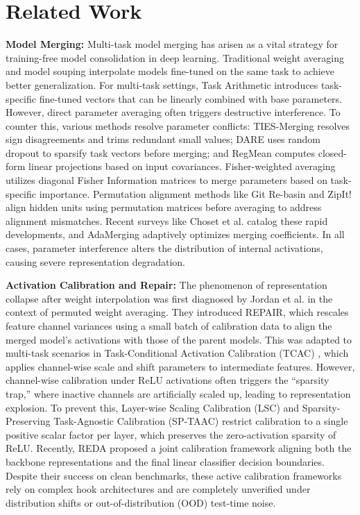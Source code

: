 \documentclass{article}
\begin{document}
\section{Related Work}
\label{sec:related}
\textbf{Model Merging:} Multi-task model merging has arisen as a vital strategy for training-free model consolidation in deep learning. Traditional weight averaging \cite{izmailov2018averaging} and model souping \cite{wortsman2022model} interpolate models fine-tuned on the same task to achieve better generalization. For multi-task settings, Task Arithmetic \cite{ilharco2022editing} introduces task-specific fine-tuned vectors that can be linearly combined with base parameters. However, direct parameter averaging often triggers destructive interference. To counter this, various methods resolve parameter conflicts: TIES-Merging \cite{yadav2023ties} resolves sign disagreements and trims redundant small values; DARE \cite{yu2023dare} uses random dropout to sparsify task vectors before merging; and RegMean \cite{jin2022regmean} computes closed-form linear projections based on input covariances. Fisher-weighted averaging \cite{matena2021merging} utilizes diagonal Fisher Information matrices to merge parameters based on task-specific importance. Permutation alignment methods like Git Re-basin \cite{ainsworth2022git} and ZipIt! \cite{stoica2023zipit} align hidden units using permutation matrices before averaging to address alignment mismatches. Recent surveys like Choset et al. \cite{choset2023model} catalog these rapid developments, and AdaMerging \cite{yang2023adamerging} adaptively optimizes merging coefficients. In all cases, parameter interference alters the distribution of internal activations, causing severe representation degradation.

\textbf{Activation Calibration and Repair:} The phenomenon of representation collapse after weight interpolation was first diagnosed by Jordan et al. \cite{jordan2022repair} in the context of permuted weight averaging. They introduced REPAIR, which rescales feature channel variances using a small batch of calibration data to align the merged model's activations with those of the parent models. This was adapted to multi-task scenarios in Task-Conditional Activation Calibration (TCAC) \cite{anonymous2026c_tcac}, which applies channel-wise scale and shift parameters to intermediate features. However, channel-wise calibration under ReLU activations often triggers the ``sparsity trap,'' where inactive channels are artificially scaled up, leading to representation explosion. To prevent this, Layer-wise Scaling Calibration (LSC) \cite{anonymous2026b_lsc} and Sparsity-Preserving Task-Agnostic Calibration (SP-TAAC) \cite{anonymous2026a_sptaac} restrict calibration to a single positive scalar factor per layer, which preserves the zero-activation sparsity of ReLU. Recently, REDA \cite{anonymous2026d_reda} proposed a joint calibration framework aligning both the backbone representations and the final linear classifier decision boundaries. Despite their success on clean benchmarks, these active calibration frameworks rely on complex hook architectures and are completely unverified under distribution shifts or out-of-distribution (OOD) test-time noise.
\end{document}

